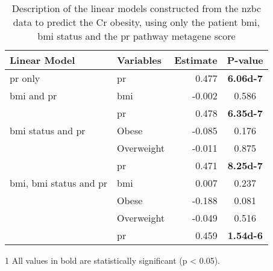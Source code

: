 \begin{table}[tpb]
	\centering
	\caption[Description of the linear models constructed from the \gls{nzbc} data to predict the Cr obesity, using only the patient \gls{bmi}, \gls{bmi} status and the \acrshort{pr} pathway metagene score]{Description of the linear models constructed from the \gls{nzbc} data to predict the Cr obesity, using only the patient \gls{bmi}, \gls{bmi} status and the \gls{pr} pathway metagene score}
	\label{tab:lm_pr_only}
	\begin{threeparttable}
			\begin{tabular}{llrS}
				Linear Model & Variables & Estimate & {P-value}\\
				\hline
				\hline
				\rule{0pt}{2.25ex}\gls{pr} only                            & \gls{pr}   & 0.477  & {\bfseries \num{6.06d-7}}\\
				\hline
				\rule{0pt}{2.25ex}\gls{bmi} and \gls{pr}                   & \gls{bmi}  & -0.002 & 0.586\\
                                                                           & \gls{pr}   & 0.478  & {\bfseries \num{6.35d-7}}\\
				\hline
				\rule{0pt}{2.25ex}\gls{bmi} status and \gls{pr}            & Obese      & -0.085 & 0.176\\
                                                                           & Overweight & -0.011 & 0.875\\
                                                                           & \gls{pr}   & 0.471  & {\bfseries \num{8.25d-7}}\\
				\hline
				\rule{0pt}{2.25ex}\gls{bmi}, \gls{bmi} status and \gls{pr} & \gls{bmi}  & 0.007  & 0.237\\
                                                                           & Obese      & -0.188 & 0.081\\
                                                                           & Overweight & -0.049 & 0.516\\
                                                                           & \gls{pr}   & 0.459  & {\bfseries \num{1.54d-6}}\\
				\hline
				\hline
			\end{tabular}
			\begin{tablenotes}
				\begin{footnotesize}
					\item [1] All values in bold are statistically significant (p \textless{} 0.05).
				\end{footnotesize}
			\end{tablenotes}
	\end{threeparttable}
\end{table}

